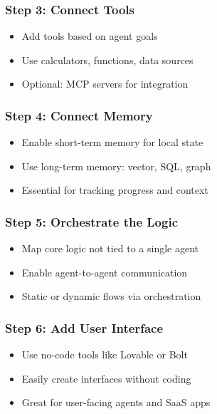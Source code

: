 \begin{frame}[fragile]\frametitle{Step 3: Connect Tools}
      \begin{itemize}
        \item Add tools based on agent goals
        \item Use calculators, functions, data sources
        \item Optional: MCP servers for integration
      \end{itemize}
\end{frame}

\begin{frame}[fragile]\frametitle{Step 4: Connect Memory}
      \begin{itemize}
        \item Enable short-term memory for local state
        \item Use long-term memory: vector, SQL, graph
        \item Essential for tracking progress and context
      \end{itemize}
\end{frame}

\begin{frame}[fragile]\frametitle{Step 5: Orchestrate the Logic}
      \begin{itemize}
        \item Map core logic not tied to a single agent
        \item Enable agent-to-agent communication
        \item Static or dynamic flows via orchestration
      \end{itemize}
\end{frame}

\begin{frame}[fragile]\frametitle{Step 6: Add User Interface}
      \begin{itemize}
        \item Use no-code tools like Lovable or Bolt
        \item Easily create interfaces without coding
        \item Great for user-facing agents and SaaS apps
      \end{itemize}
\end{frame}

